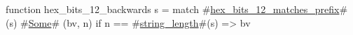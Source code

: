function hex_bits_12_backwards s =
  match #\hyperref[sailRISCVzhexzybitszy12zymatcheszyprefix]{hex\_bits\_12\_matches\_prefix}#(s) {
      #\hyperref[sailRISCVzSome]{Some}# (bv, n) if n == #\hyperref[sailRISCVzstringzylength]{string\_length}#(s) => bv
  }

